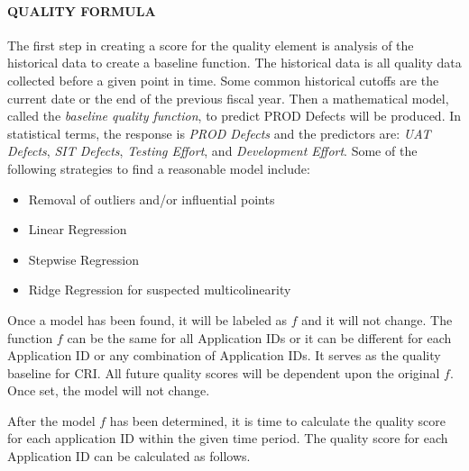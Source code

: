 \documentclass[SDSUThesis.tex]{subfiles}
\begin{document}
            \paragraph{QUALITY FORMULA}
                The first step in creating a score for the quality
                element is analysis of the historical data to create
                a baseline function.  The historical
                data is all quality data collected before  a given point
                in time.  Some common historical cutoffs are the current date
                or the end of the previous fiscal year.  Then a mathematical
                model, called the \textit{baseline quality function},
                to predict PROD Defects will be produced.  In statistical
                terms, the response is \textit{PROD Defects} and the predictors
                are: \textit{UAT Defects}, \textit{SIT Defects}, 
                \textit{Testing Effort}, and \textit{Development Effort}.  
                Some of the following strategies to find  
                a reasonable model include:
                \begin{itemize}
                    \item Removal of outliers and/or influential points
                    \item Linear Regression
                    \item Stepwise Regression
                    \item Ridge Regression for suspected multicolinearity
                \end{itemize}
                
                Once a model has been found, it will be labeled as $f$ and it
                will not change.  The function $f$ can be the same for all 
                Application IDs or it can be different for each Application ID
                or any combination of Application IDs.   It serves as the 
                quality baseline for CRI. 
                All future quality scores will be dependent upon the original
                $f$.  Once set, the model will not change.
                
                After the model $f$ has been determined, it is time
                to calculate the quality score for each application ID
                within the given time period.  The quality score
                for each Application ID can be calculated as follows.
                
\end{document}
